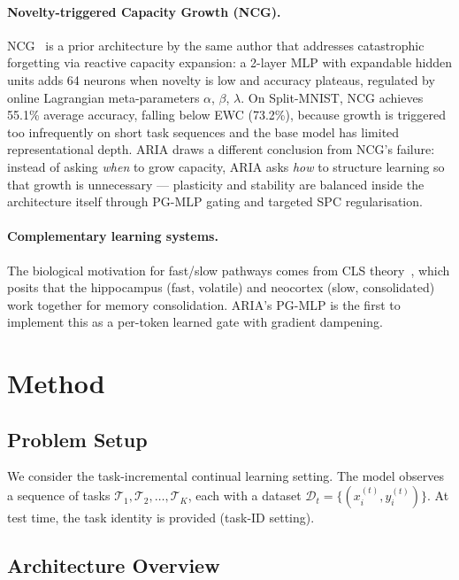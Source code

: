 \documentclass[10pt,twocolumn]{article}
\begin{document}
\paragraph{Novelty-triggered Capacity Growth (NCG).}
NCG~\citep{poudel2025ncg} is a prior architecture by the same author that addresses
catastrophic forgetting via reactive capacity expansion: a 2-layer MLP with expandable
hidden units adds 64 neurons when novelty is low and accuracy plateaus, regulated by
online Lagrangian meta-parameters $\alpha$, $\beta$, $\lambda$. On Split-MNIST, NCG
achieves 55.1\% average accuracy, falling below EWC (73.2\%), because growth is
triggered too infrequently on short task sequences and the base model has limited
representational depth. ARIA draws a different conclusion from NCG's failure: instead
of asking \emph{when} to grow capacity, ARIA asks \emph{how} to structure learning so
that growth is unnecessary --- plasticity and stability are balanced inside the
architecture itself through PG-MLP gating and targeted SPC regularisation.

\paragraph{Complementary learning systems.}
The biological motivation for fast/slow pathways comes from CLS theory~\citep{mcclelland1995complementary},
which posits that the hippocampus (fast, volatile) and neocortex (slow, consolidated)
work together for memory consolidation. ARIA's PG-MLP is the first to implement this
as a per-token learned gate with gradient dampening.

\section{Method}
\label{sec:method}

\subsection{Problem Setup}

We consider the task-incremental continual learning setting. The model observes
a sequence of tasks $\mathcal{T}_1, \mathcal{T}_2, \ldots, \mathcal{T}_K$, each
with a dataset $\mathcal{D}_t = \{(x_i^{(t)}, y_i^{(t)})\}$. At test time,
the task identity is provided (task-ID setting).

\subsection{Architecture Overview}
\end{document}
